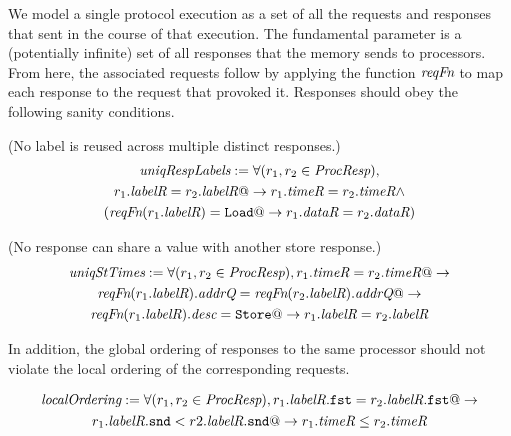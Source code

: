 We model a single protocol execution as a set of all the requests and responses
that sent in the course of that execution.
The fundamental parameter is a (potentially infinite) set \Response{} of all responses
that the memory sends to processors.  From here, the associated requests follow by
applying the function $\textit{reqFn}$ to map each response to the request that provoked it.
Responses should obey the following sanity conditions. 
\begin{defn} (No label is reused across multiple distinct responses.)
\small
\begin{multline*}
\textit{uniqRespLabels} := \forall (r_1, r_2 \in \textit{ProcResp}),\\
r_1.\textit{labelR} = r_2.\textit{labelR} @-> r_1.\textit{timeR} = r_2.\textit{timeR} \wedge\\
(\textit{reqFn}(r_1.\textit{labelR}) = \texttt{Load} @-> r_1.\textit{dataR} = r_2.\textit{dataR})
\end{multline*}
\label{uniqRespLabels}
\end{defn}

\begin{defn} (No response can share a \timeR{} value with another store response.)
\small
\begin{multline*}
\textit{uniqStTimes} := 
\forall (r_1, r_2 \in \textit{ProcResp}),
r_1.\textit{timeR} = r_2.\textit{timeR} @-> \\
\textit{reqFn} (r_1.\textit{labelR}).\textit{addrQ} = \textit{reqFn} (r_2.\textit{labelR}).\textit{addrQ} @->\\
\textit{reqFn} (r_1.\textit{labelR}).\textit{desc} = \texttt{Store} @->
r_1.\textit{labelR} = r_2.\textit{labelR}
\end{multline*}
\label{uniqStTimes}
\end{defn}

In addition, the global ordering of responses to the same processor should not
violate the local ordering of the corresponding requests.

\begin{defn}
\small
\begin{multline*}
\textit{localOrdering} :=
\forall (r_1, r_2 \in \textit{ProcResp}), r_1.\textit{labelR}.\texttt{fst} = r_2.\textit{labelR}.\texttt{fst} @->\\
r_1.\textit{labelR}.\texttt{snd} < r2.\textit{labelR}.\texttt{snd} @-> r_1.\textit{timeR} \le r_2.\textit{timeR}
\end{multline*}
\label{localOrdering}
\end{defn}

